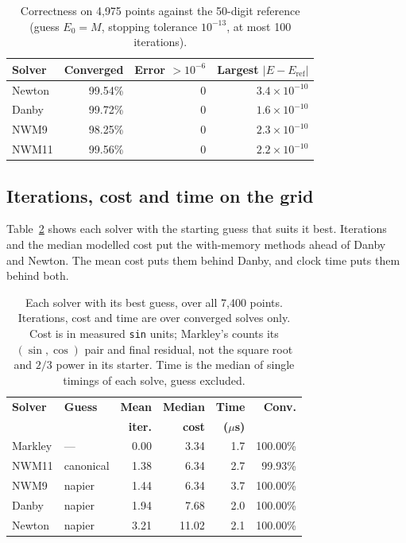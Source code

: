 \documentclass[sigconf,nonacm]{acmart}
\begin{document}
\begin{table}[h]
\centering\small
\caption{Correctness on 4{,}975 points against the 50-digit reference
(guess $E_0 = M$, stopping tolerance $10^{-13}$, at most 100 iterations).}
\label{tab:correct}
\begin{tabular}{@{}lrrr@{}}
\toprule
\textbf{Solver} & \textbf{Converged} & \textbf{Error $>10^{-6}$} & \textbf{Largest $|E-E_{\mathrm{ref}}|$} \\
\midrule
Newton & 99.54\% & 0 & $3.4\times10^{-10}$ \\
Danby  & 99.72\% & 0 & $1.6\times10^{-10}$ \\
NWM9   & 98.25\% & 0 & $2.3\times10^{-10}$ \\
NWM11  & 99.56\% & 0 & $2.2\times10^{-10}$ \\
\bottomrule
\end{tabular}
\end{table}

\subsection{Iterations, cost and time on the grid}
\label{sec:grid}

Table~\ref{tab:grid} shows each solver with the starting guess that suits
it best. Iterations and the median modelled cost put the with-memory methods
ahead of Danby and Newton. The mean cost puts them behind Danby, and
clock time puts them behind both.

\begin{table}[h]
\centering\small
\caption{Each solver with its best guess, over all 7{,}400 points.
Iterations, cost and time are over converged solves only. Cost is in
measured \texttt{sin} units; Markley's counts its $(\sin,\cos)$ pair and
final residual, not the square root and $2/3$ power in its starter. Time is
the median of single timings of each solve, guess excluded.}
\label{tab:grid}
\begin{tabular}{@{}llrrrr@{}}
\toprule
\textbf{Solver} & \textbf{Guess} & \textbf{Mean} & \textbf{Median} & \textbf{Time} & \textbf{Conv.} \\
 & & \textbf{iter.} & \textbf{cost} & \textbf{($\mu$s)} & \\
\midrule
Markley & ---       & 0.00 & 3.34  & 1.7 & 100.00\% \\
NWM11   & canonical & 1.38 & 6.34  & 2.7 & 99.93\% \\
NWM9    & napier    & 1.44 & 6.34  & 3.7 & 100.00\% \\
Danby   & napier    & 1.94 & 7.68  & 2.0 & 100.00\% \\
Newton  & napier    & 3.21 & 11.02 & 2.1 & 100.00\% \\
\bottomrule
\end{tabular}
\end{table}
\end{document}

